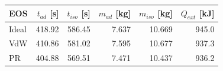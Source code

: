 \begin{tabular}{lrrrrr}
\toprule
EOS & $t_{ad}$ [s] & $t_{iso}$ [s] & $m_{ad}$ [kg] & $m_{iso}$ [kg] & $Q_{ext}$ [kJ] \\
\midrule
Ideal & 418.92 & 586.45 & 7.637 & 10.669 & 945.0 \\
VdW & 410.86 & 581.02 & 7.595 & 10.677 & 937.3 \\
PR & 404.88 & 569.51 & 7.471 & 10.437 & 936.2 \\
\bottomrule
\end{tabular}

